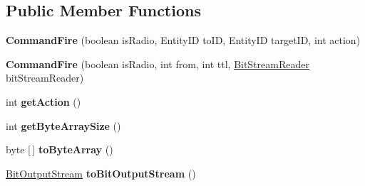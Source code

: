 \subsection*{Public Member Functions}
\begin{DoxyCompactItemize}
\item 
\hypertarget{classadf_1_1agent_1_1communication_1_1standard_1_1bundle_1_1centralized_1_1CommandFire_a7bae68e663f358632f953822a606a57e}{}\label{classadf_1_1agent_1_1communication_1_1standard_1_1bundle_1_1centralized_1_1CommandFire_a7bae68e663f358632f953822a606a57e} 
{\bfseries Command\+Fire} (boolean is\+Radio, Entity\+ID to\+ID, Entity\+ID target\+ID, int action)
\item 
\hypertarget{classadf_1_1agent_1_1communication_1_1standard_1_1bundle_1_1centralized_1_1CommandFire_a5ff648c1725987c7a6e368b0e62d109a}{}\label{classadf_1_1agent_1_1communication_1_1standard_1_1bundle_1_1centralized_1_1CommandFire_a5ff648c1725987c7a6e368b0e62d109a} 
{\bfseries Command\+Fire} (boolean is\+Radio, int from, int ttl, \hyperlink{classadf_1_1component_1_1communication_1_1util_1_1BitStreamReader}{Bit\+Stream\+Reader} bit\+Stream\+Reader)
\item 
\hypertarget{classadf_1_1agent_1_1communication_1_1standard_1_1bundle_1_1centralized_1_1CommandFire_a622b7ca860cc5f8997344f4a63c226f8}{}\label{classadf_1_1agent_1_1communication_1_1standard_1_1bundle_1_1centralized_1_1CommandFire_a622b7ca860cc5f8997344f4a63c226f8} 
int {\bfseries get\+Action} ()
\item 
\hypertarget{classadf_1_1agent_1_1communication_1_1standard_1_1bundle_1_1centralized_1_1CommandFire_af29ec7c8d3904c6b61473dc4ecf05b13}{}\label{classadf_1_1agent_1_1communication_1_1standard_1_1bundle_1_1centralized_1_1CommandFire_af29ec7c8d3904c6b61473dc4ecf05b13} 
int {\bfseries get\+Byte\+Array\+Size} ()
\item 
\hypertarget{classadf_1_1agent_1_1communication_1_1standard_1_1bundle_1_1centralized_1_1CommandFire_a36bf511b93184bd0e2d272ad89f73932}{}\label{classadf_1_1agent_1_1communication_1_1standard_1_1bundle_1_1centralized_1_1CommandFire_a36bf511b93184bd0e2d272ad89f73932} 
byte \mbox{[}$\,$\mbox{]} {\bfseries to\+Byte\+Array} ()
\item 
\hypertarget{classadf_1_1agent_1_1communication_1_1standard_1_1bundle_1_1centralized_1_1CommandFire_a6f450b71c037caca59472c7695a649af}{}\label{classadf_1_1agent_1_1communication_1_1standard_1_1bundle_1_1centralized_1_1CommandFire_a6f450b71c037caca59472c7695a649af} 
\hyperlink{classadf_1_1component_1_1communication_1_1util_1_1BitOutputStream}{Bit\+Output\+Stream} {\bfseries to\+Bit\+Output\+Stream} ()

\end{DoxyCompactItemize}
